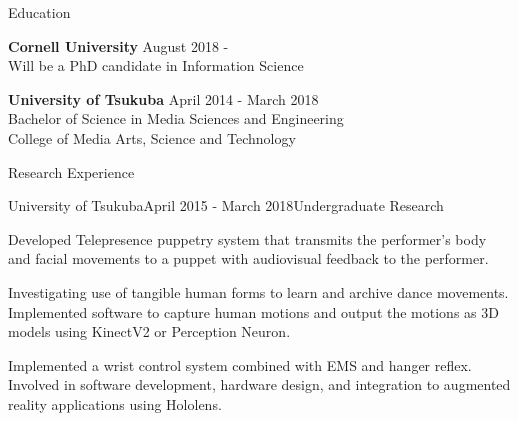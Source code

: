\documentclass{resume} %
\begin{document}

\begin{rSection}{Education}

{\bf Cornell University} \hfill {August 2018 - } 
\\ Will be a PhD candidate in Information Science

{\bf University of Tsukuba} \hfill {April 2014 - March 2018} 
\\ Bachelor of Science in Media Sciences and Engineering
\\ College of Media Arts, Science and Technology


\end{rSection}


\begin{rSection}{Research Experience}

\begin{rSubsection}{University of Tsukuba}{April 2015 - March 2018}{Undergraduate Research}{}
\item Developed Telepresence puppetry system that transmits the performer's body and facial movements to a puppet with audiovisual feedback to the performer.
\item Investigating use of tangible human forms to learn and archive dance movements. Implemented software to capture human motions and output the motions as 3D models using KinectV2 or Perception Neuron.
\item Implemented a wrist control system combined with EMS and hanger reflex. Involved in software development, hardware design, and integration to augmented reality applications using Hololens.
\end{rSubsection}




\end{rSection}
\end{document}
